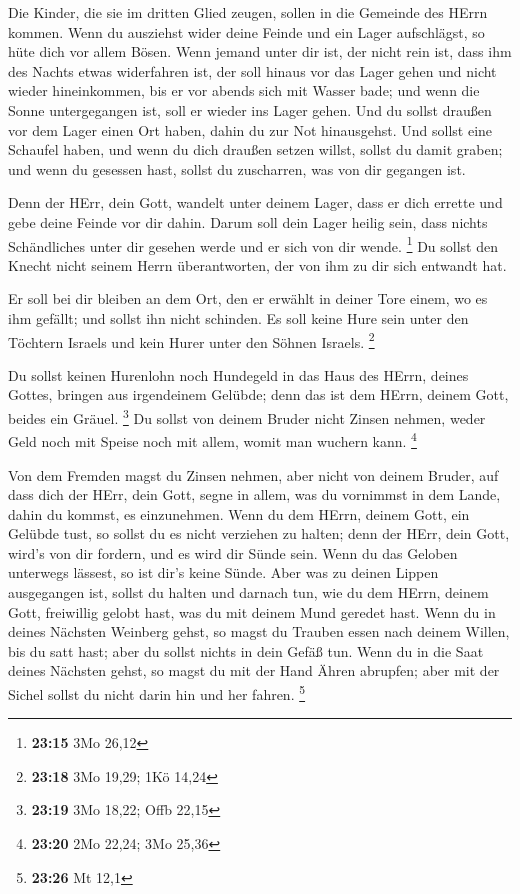  Die Kinder, die sie im dritten Glied zeugen, sollen in die
Gemeinde des HErrn kommen.  Wenn du ausziehst wider deine
Feinde und ein Lager aufschlägst, so hüte dich vor allem Bösen.
 Wenn jemand unter dir ist, der nicht rein ist, dass ihm
des Nachts etwas widerfahren ist, der soll hinaus vor das Lager gehen
und nicht wieder hineinkommen,  bis er vor abends sich mit
Wasser bade; und wenn die Sonne untergegangen ist, soll er wieder ins
Lager gehen.  Und du sollst draußen vor dem Lager einen Ort
haben, dahin du zur Not hinausgehst.  Und sollst eine
Schaufel haben, und wenn du dich draußen setzen willst, sollst du damit
graben; und wenn du gesessen hast, sollst du zuscharren, was von dir
gegangen ist.

 Denn der HErr, dein Gott, wandelt unter deinem Lager, dass
er dich errette und gebe deine Feinde vor dir dahin. Darum soll dein
Lager heilig sein, dass nichts Schändliches unter dir gesehen werde und
er sich von dir wende. \footnote{\textbf{23:15} 3Mo 26,12} 
Du sollst den Knecht nicht seinem Herrn überantworten, der von ihm zu
dir sich entwandt hat.

 Er soll bei dir bleiben an dem Ort, den er erwählt in
deiner Tore einem, wo es ihm gefällt; und sollst ihn nicht schinden.
 Es soll keine Hure sein unter den Töchtern Israels und
kein Hurer unter den Söhnen Israels. \footnote{\textbf{23:18} 3Mo 19,29;
  1Kö 14,24}

 Du sollst keinen Hurenlohn noch Hundegeld in das Haus des
HErrn, deines Gottes, bringen aus irgendeinem Gelübde; denn das ist dem
HErrn, deinem Gott, beides ein Gräuel. \footnote{\textbf{23:19} 3Mo
  18,22; Offb 22,15}  Du sollst von deinem Bruder nicht
Zinsen nehmen, weder Geld noch mit Speise noch mit allem, womit man
wuchern kann. \footnote{\textbf{23:20} 2Mo 22,24; 3Mo 25,36}

 Von dem Fremden magst du Zinsen nehmen, aber nicht von
deinem Bruder, auf dass dich der HErr, dein Gott, segne in allem, was du
vornimmst in dem Lande, dahin du kommst, es einzunehmen. 
Wenn du dem HErrn, deinem Gott, ein Gelübde tust, so sollst du es nicht
verziehen zu halten; denn der HErr, dein Gott, wird's von dir fordern,
und es wird dir Sünde sein.  Wenn du das Geloben unterwegs
lässest, so ist dir's keine Sünde.  Aber was zu deinen
Lippen ausgegangen ist, sollst du halten und darnach tun, wie du dem
HErrn, deinem Gott, freiwillig gelobt hast, was du mit deinem Mund
geredet hast.  Wenn du in deines Nächsten Weinberg gehst,
so magst du Trauben essen nach deinem Willen, bis du satt hast; aber du
sollst nichts in dein Gefäß tun.  Wenn du in die Saat
deines Nächsten gehst, so magst du mit der Hand Ähren abrupfen; aber mit
der Sichel sollst du nicht darin hin und her fahren. \footnote{\textbf{23:26}
  Mt 12,1}

